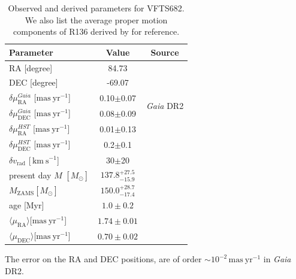 \documentclass[apjl,twocolumn]{emulateapj}
\newcommand{\kms}{{\,\mathrm{km\ s^{-1}}}}
\DeclareRobustCommand{\Secref}[1]{Sec.~\ref{#1}}
\begin{document}
\begin{table}
  \begin{center}
    \caption{Observed and derived parameters for VFTS682. We also list
    the average proper motion components of R136 derived by
    \cite{lennon:18} for reference.}
    \begin{tabular}{l|c|c}
      \hline
      \hline
      Parameter & Value & Source\\
      \hline
      RA \hfill[degree] &  \phantom{-}84.73 %
                        & \multirow{2}{*}{\cite{evans:11}}\\[5pt]
      DEC \hfill [degree] & -69.07 %
                        & \\[5pt]
      \hline
      $\delta\mu_\mathrm{RA}^{Gaia}$  \hfill[$\mathrm{mas\ yr^{-1}}$] & 0.10$\pm$0.07 & \multirow{2}{*}{\emph{Gaia} DR2}\\[5pt]
      $\delta\mu_\mathrm{DEC}^{Gaia}$  \hfill[$\mathrm{mas\ yr^{-1}}$] & 0.08$\pm$0.09 & \\[5pt]
      \hline
      $\delta\mu_\mathrm{RA}^{HST}$  \hfill[$\mathrm{mas\ yr^{-1}}$] & 0.01$\pm$0.13 & \multirow{2}{*}{\cite{platais:18}}\\[5pt]
      $\delta\mu_\mathrm{DEC}^{HST}$  \hfill[$\mathrm{mas\ yr^{-1}}$] &
                                                                        0.2$\pm$0.1 &
      \\[5pt]
      \hline
      $\delta v_\mathrm{rad}$  \hfill[$\kms$] & 30$\pm$20 & \cite{bestenlehner:11}\\
      \hline
      present day $M$ \hfill $[M_\odot]$ & $137.8^{+27.5}_
                                           {-15.9}$ &
                                                     \multirow{3}{*}{\cite{schneider:18}}\\
      $M_\mathrm{ZAMS}$\hfill $[M_\odot]$ & $150.0^{+28.7}_{-17.4}$ &
      \\
      age \hfill [Myr] & $1.0\pm0.2$ & \\
      \hline
      $\langle\mu_\mathrm{RA}\rangle$\hfill[$\mathrm{mas\ yr^{-1}}$] & $1.74\pm0.01$
                        &  \multirow{2}{*}{\cite{lennon:18}}\\[5pt]
      $\langle\mu_\mathrm{DEC}\rangle$\hfill[$\mathrm{mas\ yr^{-1}}$]
                & $0.70\pm0.02$ & \\
      \hline

    \end{tabular}
    \tablecomments
    {The error on the RA and DEC positions, are of order
      $\sim$$10^{-2}\,\mathrm{mas\ yr^{-1}}$ in \emph{Gaia}
      DR2. %
    }
  \end{center}
  \label{tab:vfts682}
\end{table}
\end{document}

